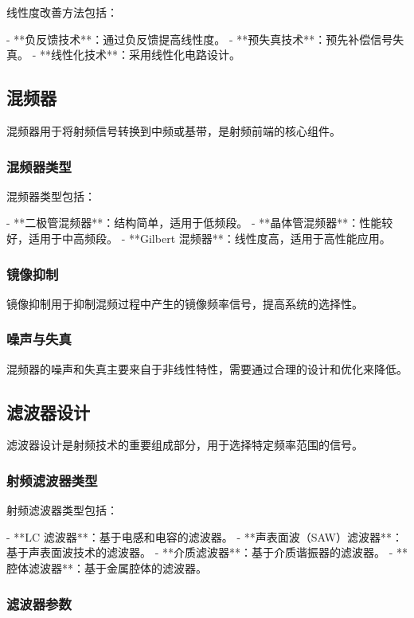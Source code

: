 \documentclass[UTF8]{ctexbook}
\begin{document}
线性度改善方法包括：

- **负反馈技术**：通过负反馈提高线性度。
- **预失真技术**：预先补偿信号失真。
- **线性化技术**：采用线性化电路设计。

\subsection{混频器}

混频器用于将射频信号转换到中频或基带，是射频前端的核心组件。

\subsubsection{混频器类型}

混频器类型包括：

- **二极管混频器**：结构简单，适用于低频段。
- **晶体管混频器**：性能较好，适用于中高频段。
- **Gilbert 混频器**：线性度高，适用于高性能应用。

\subsubsection{镜像抑制}

镜像抑制用于抑制混频过程中产生的镜像频率信号，提高系统的选择性。

\subsubsection{噪声与失真}

混频器的噪声和失真主要来自于非线性特性，需要通过合理的设计和优化来降低。

\subsection{滤波器设计}

滤波器设计是射频技术的重要组成部分，用于选择特定频率范围的信号。

\subsubsection{射频滤波器类型}

射频滤波器类型包括：

- **LC 滤波器**：基于电感和电容的滤波器。
- **声表面波（SAW）滤波器**：基于声表面波技术的滤波器。
- **介质滤波器**：基于介质谐振器的滤波器。
- **腔体滤波器**：基于金属腔体的滤波器。

\subsubsection{滤波器参数}
\end{document}
